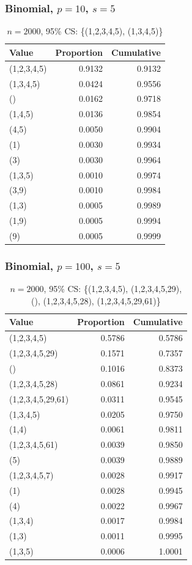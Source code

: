 \documentclass{beamer}
\begin{document}
\begin{frame}
  \frametitle{Binomial, $p=10$, $s=5$}
  \begin{table}[h]
    \footnotesize
    \centering
    \begin{tabular}{l|r|r}
      Value & Proportion & Cumulative \\
      \hline
      (1,2,3,4,5) & 0.9132 & 0.9132 \\
      (1,3,4,5) & 0.0424 & 0.9556 \\
      () & 0.0162 & 0.9718 \\
      (1,4,5) & 0.0136 & 0.9854 \\
      (4,5) & 0.0050 & 0.9904 \\
      (1) & 0.0030 & 0.9934 \\
      (3) & 0.0030 & 0.9964 \\
      (1,3,5) & 0.0010 & 0.9974 \\
      (3,9) & 0.0010 & 0.9984 \\
      (1,3) & 0.0005 & 0.9989 \\
      (1,9) & 0.0005 & 0.9994 \\
      (9) & 0.0005 & 0.9999 \\
    \end{tabular}
    \caption{{\footnotesize $n=2000$, 95\% CS: \{(1,2,3,4,5), (1,3,4,5)\}}}
  \end{table}
\end{frame}

\begin{frame}
  \frametitle{Binomial, $p=100$, $s=5$}
  \begin{table}[h]
    \footnotesize
    \centering
    \begin{tabular}{l|r|r}
      Value & Proportion & Cumulative \\
      \hline
      (1,2,3,4,5) & 0.5786 & 0.5786 \\
      (1,2,3,4,5,29) & 0.1571 & 0.7357 \\
      () & 0.1016 & 0.8373 \\
      (1,2,3,4,5,28) & 0.0861 & 0.9234 \\
      (1,2,3,4,5,29,61) & 0.0311 & 0.9545 \\
      (1,3,4,5) & 0.0205 & 0.9750 \\
      (1,4) & 0.0061 & 0.9811 \\
      (1,2,3,4,5,61) & 0.0039 & 0.9850 \\
      (5) & 0.0039 & 0.9889 \\
      (1,2,3,4,5,7) & 0.0028 & 0.9917 \\
      (1) & 0.0028 & 0.9945 \\
      (4) & 0.0022 & 0.9967 \\
      (1,3,4) & 0.0017 & 0.9984 \\
      (1,3) & 0.0011 & 0.9995 \\
      (1,3,5) & 0.0006 & 1.0001 \\
    \end{tabular}
    \caption{{\footnotesize $n=2000$, 95\% CS: \{(1,2,3,4,5), (1,2,3,4,5,29), (), (1,2,3,4,5,28), (1,2,3,4,5,29,61)\}}}
  \end{table}
\end{frame}
\end{document}

